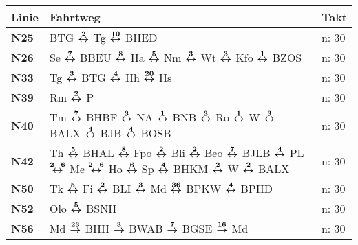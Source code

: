 \begin{minipage}[t]{0.45\textwidth}
\begin{tabular}{>{\bfseries}L{1.2cm}L{9.0cm}L{3.0cm}}
{\bfseries Linie} & {\bfseries Fahrtweg} & {\bfseries Takt} \\
\hline
\nbus{} N25   & BTG $\xarwe{2}$ Tg $\xarwe{10}$ BHED                                                                                                                                & n: 30                      \\
\nbus{} N26   & Se $\xarwe{7}$ BBEU $\xarwe{8}$ Ha $\xarwe{5}$ Nm $\xarwe{3}$ Wt $\xarwe{3}$ Kfo $\xarwe{1}$ BZOS                                                                   & n: 30                      \\
\nbus{} N33   & Tg $\xarwe{3}$ BTG $\xarwe{4}$ Hh $\xarwe{20}$ Hs                                                                                                                   & n: 30                      \\
\nbus{} N39   & Rm $\xarwe{2}$ P                                                                                                                                                    & n: 30                      \\
\nbus{} N40   & Tm $\xarwe{7}$ BHBF $\xarwe{3}$ NA $\xarwe{1}$ BNB $\xarwe{3}$ Ro $\xarwe{1}$ W $\xarwe{3}$ BALX $\xarwe{4}$ BJB $\xarwe{4}$ BOSB                                   & n: 30                      \\
\nbus{} N42   & Th $\xarwe{5}$ BHAL $\xarwe{8}$ Fpo $\xarwe{2}$ Bli $\xarwe{2}$ Beo $\xarwe{7}$ BJLB $\xarwe{4}$ PL $\xarwe{2-6}$ Me $\xarwe{2-6}$ Ho $\xarwe{6}$ Sp $\xarwe{4}$    %
                BHKM $\xarwe{2}$ W $\xarwe{2}$ BALX                                                                                                                                 & n: 30                      \\
\nbus{} N50   & Tk $\xarwe{5}$ Fi $\xarwe{2}$ BLI $\xarwe{3}$ Md $\xarwe{36}$ BPKW $\xarwe{4}$ BPHD                                                                                 & n: 30                      \\
\nbus{} N52   & Olo $\xarwe{5}$ BSNH                                                                                                                                                & n: 30                      \\
\nbus{} N56   & Md $\xarre{23}$ BHH $\xarre{3}$ BWAB $\xarre{7}$ BGSE $\xarre{16}$ Md                                                                                               & n: 30                      \\

\end{tabular}
\end{minipage}
